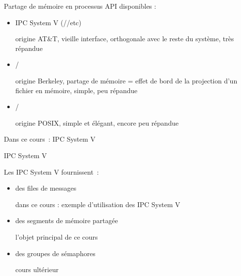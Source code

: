 \begin {frame} {Partage de mémoire en processus}
    API disponibles :

    \begin {itemize}
	\item IPC System V (//etc)

	    \implique origine AT\&T, vieille interface, orthogonale avec
		le reste du système, très répandue

	\item {}/

	    \implique origine Berkeley, partage de mémoire = effet de
		bord de la projection d'un fichier en mémoire, simple,
		peu répandue

	\item {}/

	    \implique origine POSIX, simple et élégant, encore peu
		répandue

    \end {itemize}

    \vspace* {3mm}

    Dans ce cours~: IPC System V

\end {frame}

\begin {frame} {IPC System V}

    Les IPC System V fournissent~:

    \begin {itemize}
	\item des files de messages

	    \implique dans ce cours : exemple d'utilisation des IPC
	    System V

	\item des segments de mémoire partagée

	    \implique l'objet principal de ce cours

	\item des groupes de sémaphores

	    \implique cours ultérieur

    \end {itemize}

\end {frame}

